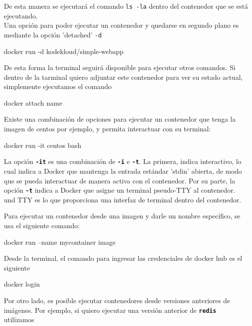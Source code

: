 De esta manera se ejecutará el comando \texttt{ls -la} dentro del contenedor que se está ejecutando. \\

Una opción para poder ejecutar un contenedor y quedarse en segundo plano es mediante la opción 'detached' \texttt{-d}

\begin{VerbatimBold}
    docker run -d kodekloud/simple-webapp
\end{VerbatimBold}

De esta forma la terminal seguirá disponible para ejecutar otros comandos. Si dentro de la tarminal quiero adjuntar este contenedor para ver su estado actual, simplemente ejecutamos el comando 

\begin{VerbatimBold}
    docker attach name
\end{VerbatimBold}

Existe una combinación de opciones para ejecutar un contenedor que tenga la imagen de centos por ejemplo, y permita interactuar con su terminal:

\begin{VerbatimBold}
docker run -it centos bash
\end{VerbatimBold}

La opción \texttt{\textbf{-it}} es una combinación de \texttt{\textbf{-i}} e \texttt{\textbf{-t}}. La primera, indica interactivo, lo cual indica a Docker que mantenga la entrada estándar 'stdin' abierta, de modo que se pueda interactuar de manera activa con el contenedor. Por su parte, la opción \texttt{\textbf{-t}} indica a Docker que asigne un terminal pseudo-TTY al contenedor. und TTY es lo que proporciona una interfaz de terminal dentro del contenedor.

Para ejecutar un contenedor desde una imagen y darle un nombre específico, se usa el siguiente comando:
\begin{VerbatimBold}
docker run --name mycontainer image
\end{VerbatimBold}

Desde la terminal, el comando para ingresar las credenciales de docker hub es el siguiente

\begin{VerbatimBold}
docker login
\end{VerbatimBold}
Por otro lado, es posible ejecutar contenedores desde versiones anteriores de imágenes. Por ejemplo, si quiero ejecutar una versión anterior de \texttt{\textbf{redis}} utilizamos

